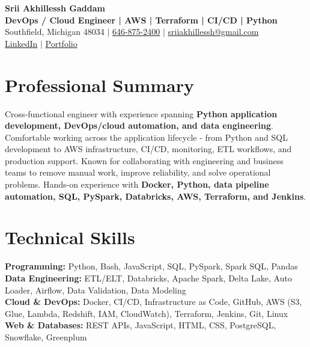 \documentclass[letterpaper,10pt]{article}
\begin{document}
\fontsize{9.35pt}{10.45pt}\selectfont

\begin{center}
    {\LARGE \textbf{Srii Akhillessh Gaddam}} \\[-1pt]
    \textbf{DevOps / Cloud Engineer | AWS | Terraform | CI/CD | Python} \\[2pt]
    Southfield, Michigan 48034 $|$
    \href{tel:6468752400}{646-875-2400} $|$
    \href{mailto:sriiakhillessh@gmail.com}{sriiakhillessh@gmail.com} \\[1pt]
    \href{https://www.linkedin.com/in/srii-akhiilessh-gaddam-b48668191/}{LinkedIn} $|$
    \href{https://sriiakhillesshg.github.io/portfolio/}{Portfolio}
\end{center}
\vspace{-8pt}

\section{Professional Summary}
\small{Cross-functional engineer with experience spanning \textbf{Python application development, DevOps/cloud automation, and data engineering}. Comfortable working across the application lifecycle - from Python and SQL development to AWS infrastructure, CI/CD, monitoring, ETL workflows, and production support. Known for collaborating with engineering and business teams to remove manual work, improve reliability, and solve operational problems. Hands-on experience with \textbf{Docker, Python, data pipeline automation, SQL, PySpark, Databricks, AWS, Terraform, and Jenkins}.}

\section{Technical Skills}
\small{
\textbf{Programming:} Python, Bash, JavaScript, SQL, PySpark, Spark SQL, Pandas \\
\textbf{Data Engineering:} ETL/ELT, Databricks, Apache Spark, Delta Lake, Auto Loader, Airflow, Data Validation, Data Modeling \\
\textbf{Cloud \& DevOps:} Docker, CI/CD, Infrastructure as Code, GitHub, AWS (S3, Glue, Lambda, Redshift, IAM, CloudWatch), Terraform, Jenkins, Git, Linux \\
\textbf{Web \& Databases:} REST APIs, JavaScript, HTML, CSS, PostgreSQL, Snowflake, Greenplum
}
\end{document}
